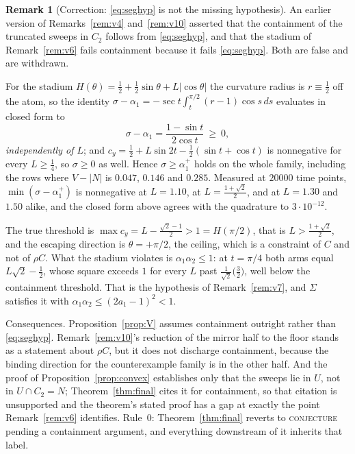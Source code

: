 \documentclass[11pt]{article}
\theoremstyle{definition}
\newtheorem{remark}[theorem]{Remark}
\newcommand{\Sig}{\Sigma}
\begin{document}
\begin{remark}[Correction: \eqref{eq:seghyp} is not the missing hypothesis]\label{rem:v13}
An earlier version of Remarks~\ref{rem:v4} and~\ref{rem:v10} asserted that the containment of
the truncated sweeps in $C_2$ follows from \eqref{eq:seghyp}, and that the stadium of
Remark~\ref{rem:v6} fails containment because it fails \eqref{eq:seghyp}. Both are false and
are withdrawn.

For the stadium $H(\theta)=\tfrac12+\tfrac12\sin\theta+L|\cos\theta|$ the curvature radius is
$r\equiv\tfrac12$ off the atom, so the identity
$\sigma-\alpha_1=-\sec t\int_t^{\pi/2}(r-1)\cos s\,ds$ evaluates in closed form to
\[
  \sigma-\alpha_1=\frac{1-\sin t}{2\cos t}\ \ge\ 0 ,
\]
\emph{independently of $L$}; and $c_y=\tfrac12+L\sin2t-\tfrac12(\sin t+\cos t)$ is
nonnegative for every $L\ge\tfrac14$, so $\sigma\ge0$ as well. Hence
$\sigma\ge\alpha_1^+$ holds on the whole family, including the rows where
$V-|N|$ is $0.047$, $0.146$ and $0.285$. Measured at $20000$ time points, $\min(\sigma-\alpha_1^+)$
is nonnegative at $L=1.10$, at $L=\tfrac{1+\sqrt2}{2}$, and at $L=1.30$ and $1.50$ alike,
and the closed form above
agrees with the quadrature to $3\cdot10^{-12}$.

The true threshold is $\max c_y=L-\tfrac{\sqrt2-1}{2}>1=H(\pi/2)$, that is
$L>\tfrac{1+\sqrt2}{2}$, and the escaping direction is $\theta=+\pi/2$, the ceiling, which is
a constraint of $C$ and not of $\rho C$. What the stadium violates is
$\alpha_1\alpha_2\le1$: at $t=\pi/4$ both arms equal $L\sqrt2-\tfrac12$, whose square exceeds
$1$ for every $L$ past $\tfrac{1}{\sqrt2}\bigl(\tfrac32\bigr)$, well below the containment
threshold. That is the hypothesis of Remark~\ref{rem:v7}, and $\Sig$ satisfies it with
$\alpha_1\alpha_2\le(2a_1-1)^2<1$.

Consequences. Proposition~\ref{prop:V} assumes containment outright rather than
\eqref{eq:seghyp}. Remark~\ref{rem:v10}'s reduction of the mirror half to the floor stands as
a statement about $\rho C$, but it does not discharge containment, because the binding
direction for the counterexample family is in the other half. And the proof of
Proposition~\ref{prop:convex} establishes only that the sweeps lie in $U$, not in
$U\cap C_2=N$; Theorem~\ref{thm:final} cites it for containment, so that citation is
unsupported and the theorem's stated proof has a gap at exactly the point
Remark~\ref{rem:v6} identifies. Rule~0: Theorem~\ref{thm:final} reverts to
\textsc{conjecture} pending a containment argument, and everything downstream of it inherits
that label.
\end{remark}
\end{document}
